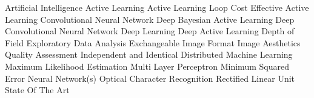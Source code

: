  {Artificial Intelligence}
 {Active Learning}
 {Active Learning Loop}
 {Cost Effective Active Learning}
 {Convolutional Neural Network}
 {Deep Bayesian Active Learning}
 {Deep Convolutional Neural Network}
 {Deep Learning}
 {Deep Active Learning}
 {Depth of Field}
 {Exploratory Data Analysis}
 {Exchangeable Image Format}
 {Image Aesthetics Quality Assessment}
 {Independent and Identical Distributed}
 {Machine Learning}
 {Maximum Likelihood Estimation}
 {Multi Layer Perceptron}
 {Minimum Squared Error}
 {Neural Network(s)}
 {Optical Character Recognition}
 {Rectified Linear Unit}
 {State Of The Art}

